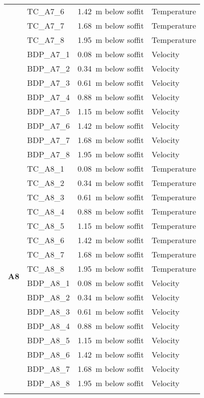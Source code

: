\begin{longtable}[c]{c|lll}
 & TC\_A7\_6  & 1.42~m below soffit  & Temperature \\
 & TC\_A7\_7  & 1.68~m below soffit  & Temperature \\
 & TC\_A7\_8  & 1.95~m below soffit  & Temperature \\
\cline{2-4}
 & BDP\_A7\_1 & 0.08~m below soffit  & Velocity \\
 & BDP\_A7\_2 & 0.34~m below soffit  & Velocity \\
 & BDP\_A7\_3 & 0.61~m below soffit  & Velocity \\
 & BDP\_A7\_4 & 0.88~m below soffit  & Velocity \\
 & BDP\_A7\_5 & 1.15~m below soffit  & Velocity \\
 & BDP\_A7\_6 & 1.42~m below soffit  & Velocity \\
 & BDP\_A7\_7 & 1.68~m below soffit  & Velocity \\
 & BDP\_A7\_8 & 1.95~m below soffit  & Velocity \\
\midrule
\multirow{16}{*}{\large{\textbf{A8}}}
 & TC\_A8\_1  & 0.08~m below soffit  & Temperature \\
 & TC\_A8\_2  & 0.34~m below soffit  & Temperature \\
 & TC\_A8\_3  & 0.61~m below soffit  & Temperature \\
 & TC\_A8\_4  & 0.88~m below soffit  & Temperature \\
 & TC\_A8\_5  & 1.15~m below soffit  & Temperature \\
 & TC\_A8\_6  & 1.42~m below soffit  & Temperature \\
 & TC\_A8\_7  & 1.68~m below soffit  & Temperature \\
 & TC\_A8\_8  & 1.95~m below soffit  & Temperature \\
\cline{2-4}
 & BDP\_A8\_1 & 0.08~m below soffit  & Velocity \\
 & BDP\_A8\_2 & 0.34~m below soffit  & Velocity \\
 & BDP\_A8\_3 & 0.61~m below soffit  & Velocity \\
 & BDP\_A8\_4 & 0.88~m below soffit  & Velocity \\
 & BDP\_A8\_5 & 1.15~m below soffit  & Velocity \\
 & BDP\_A8\_6 & 1.42~m below soffit  & Velocity \\
 & BDP\_A8\_7 & 1.68~m below soffit  & Velocity \\
 & BDP\_A8\_8 & 1.95~m below soffit  & Velocity \\
\bottomrule
\newpage
\multirow{16}{*}{\large{\textbf{A9}}}

\end{longtable}
